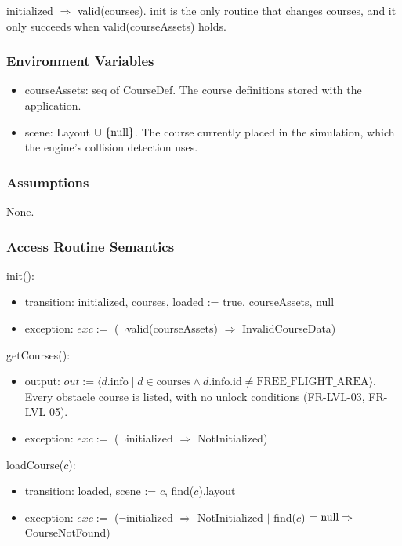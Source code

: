 \documentclass[12pt, titlepage]{article}
\newcommand{\True}{\textnormal{true}}
\newcommand{\nul}{\textnormal{null}}
\newcommand{\noinit}{$\neg$initialized $\Rightarrow$ NotInitialized}
\begin{document}
initialized $\Rightarrow$ valid(courses). init is the only routine that changes
courses, and it only succeeds when valid(courseAssets) holds.

\subsubsection{Environment Variables}

\begin{itemize}
\item courseAssets: seq of CourseDef. The course definitions stored with the
  application.
\item scene: Layout $\cup \ \{\nul\}$. The course currently placed in the
  simulation, which the engine's collision detection uses.
\end{itemize}

\subsubsection{Assumptions}

None.

\subsubsection{Access Routine Semantics}

\noindent init():
\begin{itemize}
\item transition: initialized, courses, loaded := \True, courseAssets, \nul
\item exception: $exc :=$ ($\neg$valid(courseAssets) $\Rightarrow$
  InvalidCourseData)
\end{itemize}

\noindent getCourses():
\begin{itemize}
\item output: $out := \langle d.\text{info} \;|\; d \in \text{courses} \wedge
  d.\text{info.id} \neq \text{FREE\_FLIGHT\_AREA} \rangle$. Every obstacle
  course is listed, with no unlock conditions (FR-LVL-03, FR-LVL-05).
\item exception: $exc :=$ (\noinit)
\end{itemize}

\noindent loadCourse($c$):
\begin{itemize}
\item transition: loaded, scene := $c$, find($c$).layout
\item exception: $exc :=$ (\noinit{} $|$ find($c$) $= \nul \Rightarrow$
  CourseNotFound)
\end{itemize}
\end{document}
